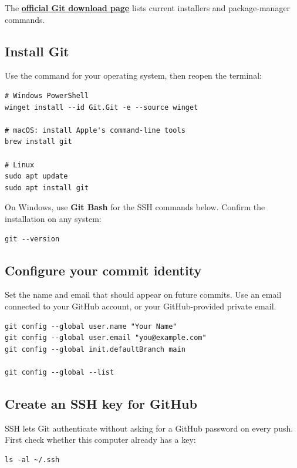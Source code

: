 The \href{https://git-scm.com/install/}{\textbf{official Git download page}} lists current installers and package-manager commands.

\subsection{Install Git}

Use the command for your operating system, then reopen the terminal:

\begin{lstlisting}[style=mlterminal]
# Windows PowerShell
winget install --id Git.Git -e --source winget

# macOS: install Apple's command-line tools
brew install git

# Linux
sudo apt update
sudo apt install git
\end{lstlisting}

On Windows, use \textbf{Git Bash} for the SSH commands below. Confirm the installation on any system:

\begin{lstlisting}[style=mlterminal]
git --version
\end{lstlisting}

\subsection{Configure your commit identity}

Set the name and email that should appear on future commits. Use an email
connected to your GitHub account, or your GitHub-provided private email.

\begin{lstlisting}[style=mlterminal]
git config --global user.name "Your Name"
git config --global user.email "you@example.com"
git config --global init.defaultBranch main

git config --global --list
\end{lstlisting}

\subsection{Create an SSH key for GitHub}

SSH lets Git authenticate without asking for a GitHub password on every push.
First check whether this computer already has a key:

\begin{lstlisting}[style=mlterminal]
ls -al ~/.ssh
\end{lstlisting}

